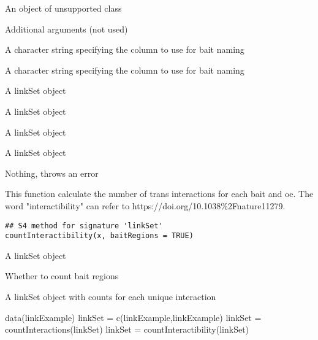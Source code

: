 \documentclass[letterpaper]{book}
\begin{document}
%
\begin{Arguments}
\begin{ldescription}
\item[\code{x}] An object of unsupported class

\item[\code{...}] Additional arguments (not used)

\item[\code{baitCol}] A character string specifying the column to use for bait naming

\item[\code{specificCol}] A character string specifying the column to use for bait naming
\end{ldescription}
\end{Arguments}
%
\begin{Value}
A linkSet object

A linkSet object

A linkSet object

A linkSet object

Nothing, throws an error
\end{Value}
%
\begin{Description}
This function calculate the number of trans interactions for each bait and oe. The word "interactibility" can refer to https://doi.org/10.1038\%2Fnature11279.
\end{Description}
%
\begin{Usage}
\begin{verbatim}
## S4 method for signature 'linkSet'
countInteractibility(x, baitRegions = TRUE)
\end{verbatim}
\end{Usage}
%
\begin{Arguments}
\begin{ldescription}
\item[\code{x}] A linkSet object

\item[\code{baitRegions}] Whether to count bait regions
\end{ldescription}
\end{Arguments}
%
\begin{Value}
A linkSet object with counts for each unique interaction
\end{Value}
%
\begin{Examples}
\begin{ExampleCode}
data(linkExample)
linkSet = c(linkExample,linkExample)
linkSet = countInteractions(linkSet)
linkSet = countInteractibility(linkSet)
\end{ExampleCode}
\end{Examples}
\end{document}
